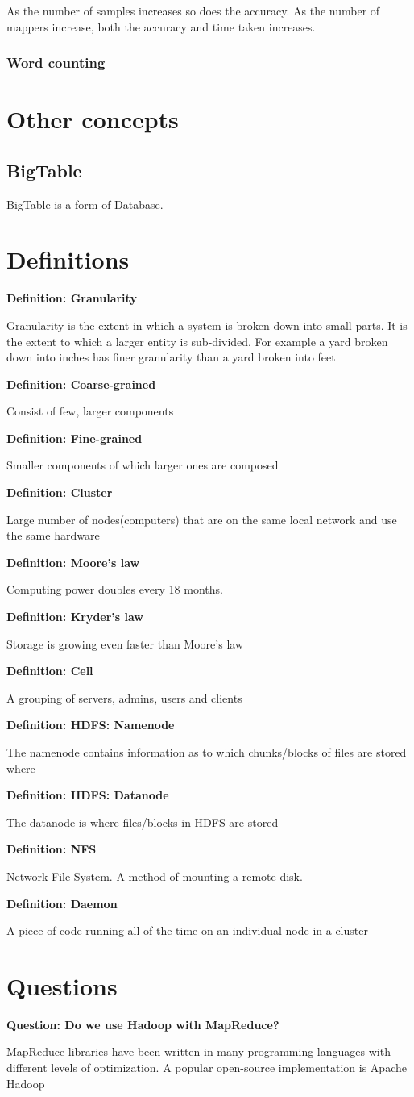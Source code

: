 \documentclass[11pt]{article}
\newcommand{\define}[2] {
  \textbf{Definition: #1}
  \begin{center} #2
\end{center}
}
\newcommand{\question}[2] {
  \textbf{Question: #1}
  \begin{center} #2
\end{center}
}
\begin{document}
As the number of samples increases so does the accuracy. As the number of mappers increase, both the accuracy and time taken increases.

\subsubsection*{Word counting}


\section{Other concepts}

\subsection{BigTable}
BigTable is a form of Database.

\section{Definitions}

\define{Granularity}{Granularity is the extent in which a system is broken down into small parts. It is the extent to which a larger entity is sub-divided. For example a yard broken down into inches has finer granularity than a yard broken into feet}
\define{Coarse-grained}{Consist of few, larger components}
\define{Fine-grained}{Smaller components of which larger ones are composed}
\define{Cluster}{Large number of nodes(computers) that are on the same local network and use the same hardware}
\define{Moore's law}{Computing power doubles every 18 months.}
\define{Kryder's law}{Storage is growing even faster than Moore's law}
\define{Cell}{A grouping of servers, admins, users and clients}
\define{HDFS: Namenode}{The namenode contains information as to which chunks/blocks of files are stored where}
\define{HDFS: Datanode}{The datanode is where files/blocks in HDFS are stored}
\define{NFS}{Network File System. A method of mounting a remote disk.}
\define{Daemon}{A piece of code running all of the time on an individual node in a cluster}

\section{Questions}

\question{Do we use Hadoop with MapReduce?}{MapReduce libraries have been written in many programming languages with different levels of optimization. A popular open-source implementation is Apache Hadoop \cite{wiki}}
\end{document}
